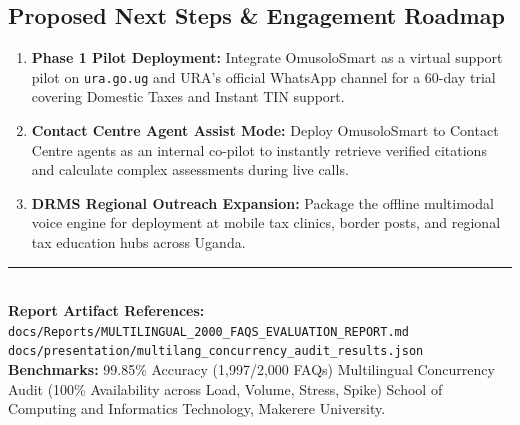 \documentclass[10pt,a4paper]{article}
\begin{document}
\subsection{Proposed Next Steps \& Engagement Roadmap}
\begin{enumerate}
  \item \textbf{Phase 1 Pilot Deployment:} Integrate OmusoloSmart as a virtual support pilot on \texttt{ura.go.ug} and URA's official WhatsApp channel for a 60-day trial covering Domestic Taxes and Instant TIN support.
  \item \textbf{Contact Centre Agent Assist Mode:} Deploy OmusoloSmart to Contact Centre agents as an internal co-pilot to instantly retrieve verified citations and calculate complex assessments during live calls.
  \item \textbf{DRMS Regional Outreach Expansion:} Package the offline multimodal voice engine for deployment at mobile tax clinics, border posts, and regional tax education hubs across Uganda.
\end{enumerate}

\vspace{4mm}
\rule{\textwidth}{0.4pt}\\
{\footnotesize \textbf{Report Artifact References:} \texttt{docs/Reports/MULTILINGUAL\_2000\_FAQS\_EVALUATION\_REPORT.md} \textbullet{} \texttt{docs/presentation/multilang\_concurrency\_audit\_results.json}\\
\textbf{Benchmarks:} 99.85\% Accuracy (1,997/2,000 FAQs) \textbullet{} Multilingual Concurrency Audit (100\% Availability across Load, Volume, Stress, Spike) \textbullet{} School of Computing and Informatics Technology, Makerere University.}
\end{document}
